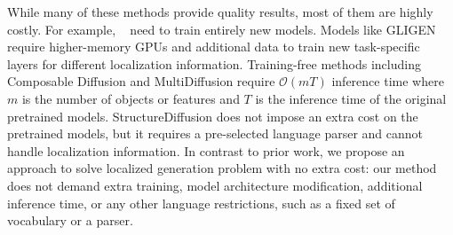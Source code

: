 While many of these methods provide quality results, most of them are highly costly. For example, ~\citet{spade,pix2pix} need to train entirely new models. Models like GLIGEN require higher-memory GPUs and additional data to train new task-specific layers for different localization information. Training-free methods including Composable Diffusion and MultiDiffusion require $\mathcal{O}(mT)$ inference time where $m$ is the number of objects or features and $T$ is the inference time of the original pretrained models. StructureDiffusion does not impose an extra cost on the pretrained models, but it requires a pre-selected language parser and cannot handle localization information. In contrast to prior work, we propose an approach to solve localized generation problem with no extra cost: our method does not demand extra training, model architecture modification, additional inference time, or any other language restrictions, such as a fixed set of vocabulary or a parser.















